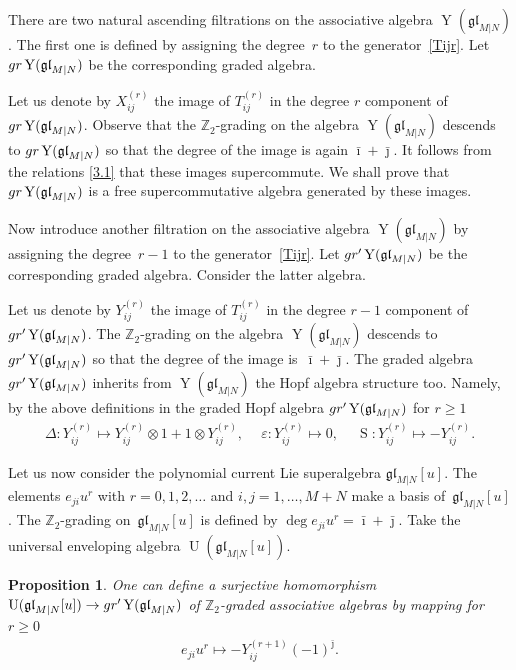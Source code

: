 \documentclass[11pt]{article}
\numberwithin{equation}{section}
\newtheorem{Proposition}[Theorem]{Proposition}
\def\bi{{\bar\imath }}
\def\bj{{\bar\jmath }}
\def\De{\Delta}
\def\ep{\varepsilon}
\def\g{\glMN [u]}
\def\ge{\geqslant}
\def\glMN{\mathfrak{gl}_{M|N}}
\def\gr{{\rm gr} }
\def\grpr{{\rm gr}^{\prime} }
\def\ot{\otimes}
\def\S{\operatorname{S}}
\def\Ug{\operatorname{U}(\g)}
\def\YMN{\operatorname{Y}(\glMN)}
\def\ZZ{\mathbb{Z}}
\begin{document}
There are two natural
ascending filtrations on
the associative algebra $\YMN $. The first one is defined by
assigning the degree~$r$ to the generator~\eqref{Tijr}.
Let $\gr\YMN$ be the corresponding graded algebra.

Let us denote by $X_{ij}^{(r)}$ the image of $T_{ij}^{(r)}$
in the degree $r$ component of $\gr\YMN $.
Observe that the $\ZZ_2 $-grading on the algebra $\YMN$ descends to
$\gr\YMN$ so that the degree of the image is again
$\bi + \bj $. It follows from the relations \eqref{3.1}
that these images supercommute.
We shall prove that
$\gr\YMN$ is a free supercommutative algebra generated by
these images.

Now introduce another filtration on the associative algebra $\YMN$
by assigning the deg\-ree~$r-1$ to the generator~\eqref{Tijr}.
Let $\grpr\YMN$ be the corresponding graded algebra.
Consider the latter algebra.

Let us denote by $Y_{ij}^{(r)}$ the image of $T_{ij}^{(r)}$
in the degree $r-1$ component of $\grpr\YMN $.
The $\ZZ_2 $-grading on the algebra
$\YMN$ descends to
$\grpr\YMN$ so that the degree of the image is~$\bi + \bj $.
The graded algebra $\grpr\YMN$ inherits from $\YMN$ the Hopf algebra structure too.
Namely, by the above definitions in
the graded Hopf algebra $\grpr\YMN$ for $r\ge1$ %
\begin{gather}
\label{grprH}
\De: Y_{ij}^{(r)}\mapsto Y_{ij}^{(r)}\ot1+1\ot Y_{ij}^{(r)} ,
\ \quad
\ep: Y_{ij}^{(r)}\mapsto0 ,
\ \quad
\S: Y_{ij}^{(r)}\mapsto- Y_{ij}^{(r)} .
\end{gather}

Let us now consider the polynomial current Lie superalgebra $\g $.
The elements $e_{ji} u^{r}$ with $r=0 ,1 ,2 , \dots$
and $i ,j=1 ,\dots, M+N$ make a basis of~$\g $.
The $\ZZ_{2}$-grading on~$\g$ is defined by
$\deg e_{ji} u^{r}=\bi+\bj $. Take
the universal enveloping algebra $\Ug $.

\begin{Proposition}
\label{P21}
One can define a surjective homomorphism $\Ug\to\grpr\YMN$
of $\ZZ_2$-graded associative algebras by mapping for $r\ge0$
\begin{gather}
\label{UY}
e_{ji} u^r\mapsto- Y_{ij}^{(r+1)} {(-1)}^{\bj} .
\end{gather}
\end{Proposition}
\end{document}
